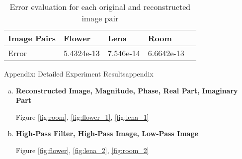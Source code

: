 \begin{table}[]
    \centering
    \begin{tabular}{|l|l|l|l|l|}
        \hline
        Image Pairs & Flower & Lena & Room \\ \hline
        Error        & 5.4324e-13  & 7.546e-14     & 6.6642e-13   \\ \hline
          
    \end{tabular}
    \caption{Error evaluation for each original and reconstructed image pair}
    \label{table:evaluation}
\end{table}

\begin{problem}{Appendix: Detailed Experiment Results}{appendix}
    \begin{enumerate}[(a)]
        \item \textbf{Reconstructed Image, Magnitude, Phase, Real Part, Imaginary Part}

        Figure \ref{fig:room}, \ref{fig:flower_1}, \ref{fig:lena_1}
        \item \textbf{High-Pass Filter, High-Pass Image, Low-Pass Image}

        Figure \ref{fig:flower}, \ref{fig:lena_2}, \ref{fig:room_2}
    \end{enumerate}
\end{problem}

